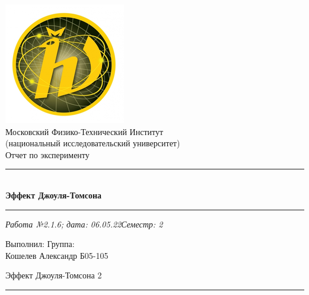 \documentclass[12pt,a4paper]{scrartcl}
\begin{document}
	\begin{titlepage}
		
		\vspace*{\fill}
		
		\begin{center}
			\includegraphics[scale=0.8]{MIPT.png}
			\\[0.7cm]\Huge Московский Физико-Технический Институт\\(национальный исследовательский университет)
			\\[2cm]\LARGE Отчет по эксперименту
			\\[0.5cm]\noindent\rule{\textwidth}{1pt}
			\\\Huge\textbf{Эффект Джоуля-Томсона}
			\\[-0.5cm]\noindent\rule{\textwidth}{1pt}
		\end{center}
		
		\begin{flushleft}
			\textit{Работа №2.1.6; дата: 06.05.22}\hfill\textit{Семестр: 2}
		\end{flushleft}
		
		\vspace*{\fill}
		
		\begin{flushleft}
			Выполнил: \hspace{\fill} Группа:
			\\Кошелев Александр \hspace{\fill} Б05-105
		\end{flushleft}
	\end{titlepage}
	
	
	\begin{flushleft}
		\footnotesize{Эффект Джоуля-Томсона} \hspace{\fill} \footnotesize{2}
		\\[-0.3cm]\noindent\rule{\textwidth}{0.3pt}
	\end{flushleft}
	
\end{document}
